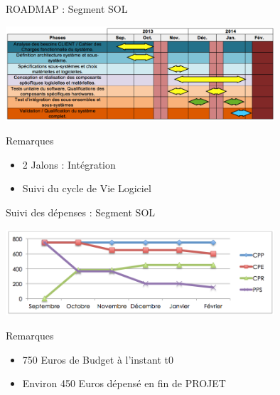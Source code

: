 \documentclass[11pt]{beamer}
\begin{document}
	\begin{frame}{ROADMAP : Segment SOL}
		\begin{center}
			\includegraphics[width=10cm]{common/roadmap.png}
		\end{center}
		\pause
		\begin{block}{Remarques}
		\begin{itemize}
			\item 2 Jalons : Intégration
			\item Suivi du cycle de Vie Logiciel
		\end{itemize}
		\end{block}
	\end{frame}
	
	\begin{frame}{Suivi des dépenses : Segment SOL}
		\begin{center}
			\includegraphics[width=10cm]{common/depenses.png}
		\end{center}
		\pause
		\begin{block}{Remarques}
		\begin{itemize}
			\item 750 Euros de Budget à l'instant t0
			\item Environ 450 Euros dépensé en fin de PROJET
		\end{itemize}
		\end{block}
	\end{frame}
	
	
\end{document}
